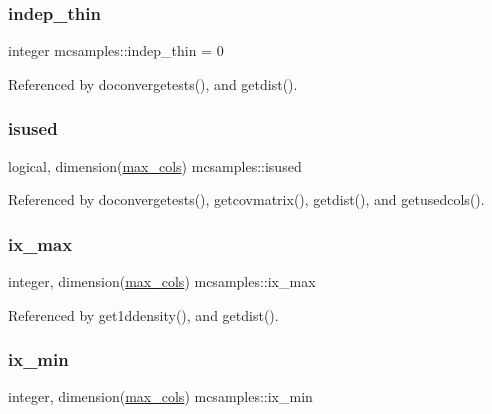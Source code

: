 \subsubsection{\texorpdfstring{indep\+\_\+thin}{indep\_thin}}
{\footnotesize\ttfamily integer mcsamples\+::indep\+\_\+thin = 0}



Referenced by doconvergetests(), and getdist().

\mbox{\label{namespacemcsamples_a6269903cd9674bdcc7c4527acdddfef3}} 
\subsubsection{\texorpdfstring{isused}{isused}}
{\footnotesize\ttfamily logical, dimension(\mbox{\hyperlink{namespacemcsamples_ae8386bad918d8af8d203683c01d5818c}{max\+\_\+cols}}) mcsamples\+::isused}



Referenced by doconvergetests(), getcovmatrix(), getdist(), and getusedcols().

\mbox{\label{namespacemcsamples_a6a48f0fe15a7b6bfe99092a09e22a218}} 
\subsubsection{\texorpdfstring{ix\+\_\+max}{ix\_max}}
{\footnotesize\ttfamily integer, dimension(\mbox{\hyperlink{namespacemcsamples_ae8386bad918d8af8d203683c01d5818c}{max\+\_\+cols}}) mcsamples\+::ix\+\_\+max}



Referenced by get1ddensity(), and getdist().

\mbox{\label{namespacemcsamples_a782e4892c659b02c05a3134ad4c32bac}} 
\subsubsection{\texorpdfstring{ix\+\_\+min}{ix\_min}}
{\footnotesize\ttfamily integer, dimension(\mbox{\hyperlink{namespacemcsamples_ae8386bad918d8af8d203683c01d5818c}{max\+\_\+cols}}) mcsamples\+::ix\+\_\+min}



